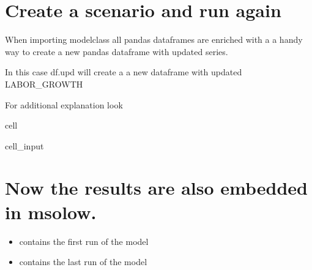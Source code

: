 \documentclass[letterpaper,10pt,english]{jupyterBook}
\begin{document}
\section{Create a scenario and run again}
\label{\detokenize{content/notebooks/intro/Example Solow:create-a-scenario-and-run-again}}
\begin{sphinxShadowBox}

\sphinxAtStartPar
When importing modelclass all pandas dataframes are enriched with a a handy way to create a new pandas dataframe with updated series.

\sphinxAtStartPar
In this case df.upd will create a a new dataframe with updated LABOR\_GROWTH

\sphinxAtStartPar
For additional explanation look {\hyperref[\detokenize{content/howto/update/model update::doc}]{}}
\end{sphinxShadowBox}

\begin{sphinxuseclass}{cell}\begin{sphinxVerbatimInput}

\begin{sphinxuseclass}{cell_input}
\begin{sphinxVerbatim}[commandchars=\\\{\}]
    
     
\end{sphinxVerbatim}

\end{sphinxuseclass}\end{sphinxVerbatimInput}

\end{sphinxuseclass}

\section{Now the results are also embedded in msolow.}
\label{\detokenize{content/notebooks/intro/Example Solow:now-the-results-are-also-embedded-in-msolow}}\begin{itemize}
\item {} 
\sphinxAtStartPar
{} contains the first run of the model

\item {} 
\sphinxAtStartPar
{} contains the last run of the model

\end{itemize}
\end{document}
